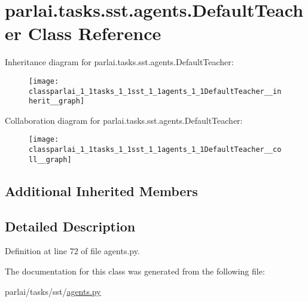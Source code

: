 \hypertarget{classparlai_1_1tasks_1_1sst_1_1agents_1_1DefaultTeacher}{}\section{parlai.\+tasks.\+sst.\+agents.\+Default\+Teacher Class Reference}
\label{classparlai_1_1tasks_1_1sst_1_1agents_1_1DefaultTeacher}


Inheritance diagram for parlai.\+tasks.\+sst.\+agents.\+Default\+Teacher\+:
\nopagebreak
\begin{figure}[H]
\begin{center}
\leavevmode
\texttt{[image: classparlai\_1\_1tasks\_1\_1sst\_1\_1agents\_1\_1DefaultTeacher\_\_inherit\_\_graph]}
\end{center}
\end{figure}


Collaboration diagram for parlai.\+tasks.\+sst.\+agents.\+Default\+Teacher\+:
\nopagebreak
\begin{figure}[H]
\begin{center}
\leavevmode
\texttt{[image: classparlai\_1\_1tasks\_1\_1sst\_1\_1agents\_1\_1DefaultTeacher\_\_coll\_\_graph]}
\end{center}
\end{figure}
\subsection*{Additional Inherited Members}


\subsection{Detailed Description}


Definition at line 72 of file agents.\+py.



The documentation for this class was generated from the following file\+:\begin{DoxyCompactItemize}
\item 
parlai/tasks/sst/\hyperlink{parlai_2tasks_2sst_2agents_8py}{agents.\+py}\end{DoxyCompactItemize}
